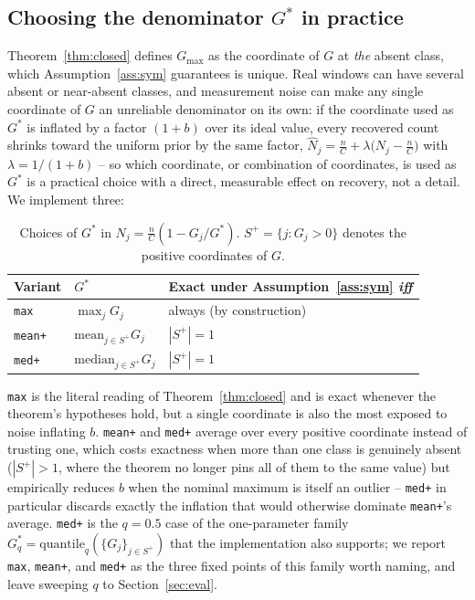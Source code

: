 \subsection{Choosing the denominator $G^*$ in practice}
\label{sec:method-gstar}

Theorem~\ref{thm:closed} defines $G_{\max}$ as the coordinate of $G$ at
\emph{the} absent class, which Assumption~\ref{ass:sym} guarantees is
unique. Real windows can have several absent or near-absent classes, and
measurement noise can make any single coordinate of $G$ an unreliable
denominator on its own: if the coordinate used as $G^*$ is inflated by a
factor $(1+b)$ over its ideal value, every recovered count shrinks toward
the uniform prior by the same factor,
$\widehat N_j = \tfrac nC + \lambda\bigl(N_j - \tfrac nC\bigr)$ with
$\lambda = 1/(1+b)$ -- so which coordinate, or combination of
coordinates, is used as $G^*$ is a practical choice with a direct,
measurable effect on recovery, not a detail. We implement three:

\begin{table}[t]
\centering
\caption{Choices of $G^*$ in $N_j = \tfrac nC(1-G_j/G^*)$. $S^+ = \{j :
G_j>0\}$ denotes the positive coordinates of $G$.}
\label{tab:gstar}
\small
\begin{tabular}{@{}llp{3.1cm}@{}}
\toprule
Variant & $G^*$ & Exact under Assumption~\ref{ass:sym} \emph{iff} \\
\midrule
\texttt{max}    & $\max_j G_j$                 & always (by construction) \\
\texttt{mean+}  & $\mathrm{mean}_{j\in S^+} G_j$ & $|S^+|=1$ \\
\texttt{med+}   & $\mathrm{median}_{j\in S^+} G_j$ & $|S^+|=1$ \\
\bottomrule
\end{tabular}
\end{table}

\texttt{max} is the literal reading of Theorem~\ref{thm:closed} and is
exact whenever the theorem's hypotheses hold, but a single coordinate is
also the most exposed to noise inflating $b$. \texttt{mean+} and
\texttt{med+} average over every positive coordinate instead of trusting
one, which costs exactness when more than one class is genuinely absent
($|S^+|>1$, where the theorem no longer pins all of them to the same
value) but empirically reduces $b$ when the nominal maximum is itself an
outlier -- \texttt{med+} in particular discards exactly the inflation
that would otherwise dominate \texttt{mean+}'s average. \texttt{med+} is
the $q=0.5$ case of the one-parameter family
$G^*_q = \mathrm{quantile}_q(\{G_j\}_{j\in S^+})$ that the implementation
also supports; we report \texttt{max}, \texttt{mean+}, and \texttt{med+}
as the three fixed points of this family worth naming, and leave sweeping
$q$ to Section~\ref{sec:eval}.

